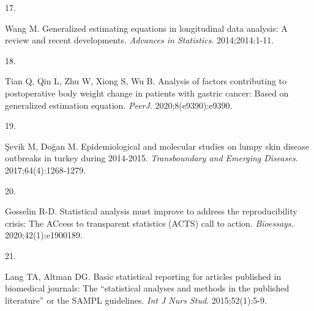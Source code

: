 \documentclass[
]{article}
\newlength{\cslhangindent}
\newlength{\csllabelwidth}
\newlength{\cslentryspacingunit} %
\newenvironment{CSLReferences}[2] %
 {%
  \setlength{\parindent}{0pt}
  \ifodd #1
  \let\oldpar\par
  \def\par{\hangindent=\cslhangindent\oldpar}
  \fi
  \setlength{\parskip}{#2\cslentryspacingunit}
 }%
 {}
\newcommand{\CSLLeftMargin}[1]{\parbox[t]{\csllabelwidth}{#1}}
\newcommand{\CSLRightInline}[1]{\parbox[t]{\linewidth - \csllabelwidth}{#1}\break}
\begin{document}
\begin{CSLReferences}{0}{0}
\leavevmode{}%
\CSLLeftMargin{17. }%
\CSLRightInline{Wang M. Generalized estimating equations in longitudinal
data analysis: A review and recent developments. \emph{Advances in
Statistics}. 2014;2014:1-11.}

\leavevmode{}%
\CSLLeftMargin{18. }%
\CSLRightInline{Tian Q, Qin L, Zhu W, Xiong S, Wu B. Analysis of factors
contributing to postoperative body weight change in patients with
gastric cancer: Based on generalized estimation equation. \emph{PeerJ}.
2020;8(e9390):e9390.}

\leavevmode{}%
\CSLLeftMargin{19. }%
\CSLRightInline{Şevik M, Doğan M. Epidemiological and molecular studies
on lumpy skin disease outbreaks in turkey during 2014-2015.
\emph{Transboundary and Emerging Diseases}. 2017;64(4):1268-1279.}

\leavevmode{}%
\CSLLeftMargin{20. }%
\CSLRightInline{Gosselin R-D. Statistical analysis must improve to
address the reproducibility crisis: The {ACcess} to transparent
statistics ({ACTS}) call to action. \emph{Bioessays}.
2020;42(1):e1900189.}

\leavevmode{}%
\CSLLeftMargin{21. }%
\CSLRightInline{Lang TA, Altman DG. Basic statistical reporting for
articles published in biomedical journals: The {``statistical analyses
and methods in the published literature''} or the {SAMPL} guidelines.
\emph{Int J Nurs Stud}. 2015;52(1):5-9.}

\end{CSLReferences}
\end{document}
